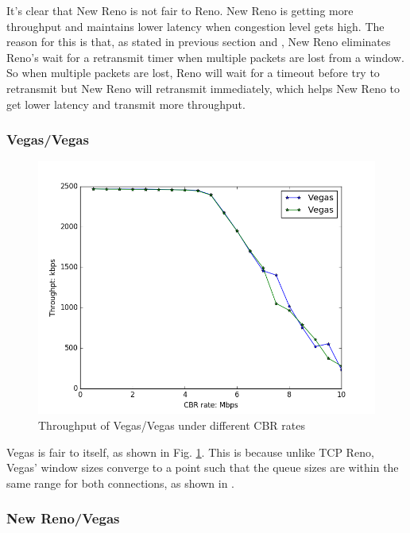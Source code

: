 \documentclass[10pt, conference]{IEEEtran/IEEEtran}
\begin{document}
It's clear that New Reno is not fair to Reno. New Reno is getting more throughput and maintains lower latency when congestion level gets high. The reason for this is that, as stated in previous section and \cite{sim}, New Reno eliminates Reno's wait for a retransmit timer when multiple packets are lost from a window. So when multiple packets are lost, Reno will wait for a timeout before try to retransmit but New Reno will retransmit immediately, which helps New Reno to get lower latency and transmit more throughput.



\subsubsection{Vegas/Vegas}
\begin{figure}[!hb]
\begin{center}
\includegraphics[width=\linewidth]{../exp2/exp2_Vegas_Vegas_thpt.png}
\caption{Throughput of Vegas/Vegas under different CBR rates}
\label{exp2_Vegas_Vegas_thpt}
\end{center}
\end{figure}
Vegas is fair to itself, as shown in Fig. \ref{exp2_Vegas_Vegas_thpt}. This is because unlike TCP Reno, Vegas'
window sizes converge to a point such that the queue sizes are within the same range for both connections, as shown in \cite{reno}.
\subsubsection{New Reno/Vegas}
\end{document}
